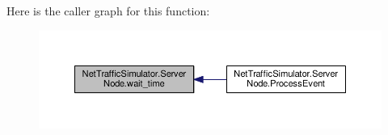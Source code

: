Here is the caller graph for this function\-:\nopagebreak
\begin{figure}[H]
\begin{center}
\leavevmode
\includegraphics[width=350pt]{classNetTrafficSimulator_1_1ServerNode_a95a09cca40cf33abb200fa8c704f00a3_icgraph}
\end{center}
\end{figure}




